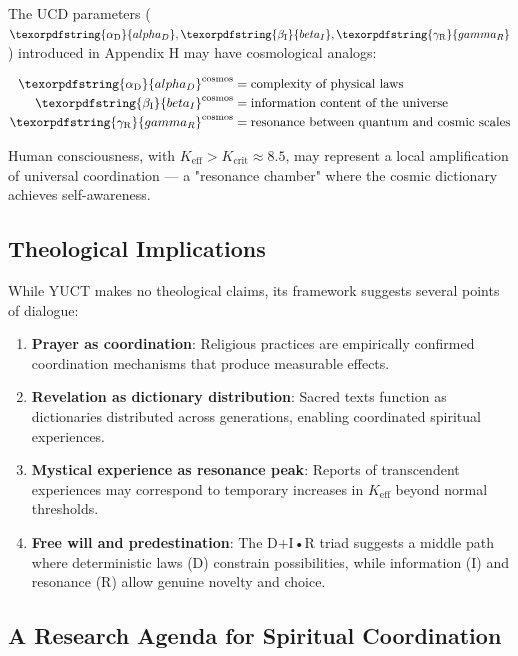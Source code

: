 \documentclass[12pt,a4paper]{article}
\DeclareRobustCommand{\alD}{\texorpdfstring{\ensuremath{\alpha_{\mathrm{D}}}}{alpha_D}}
\DeclareRobustCommand{\beI}{\texorpdfstring{\ensuremath{\beta_{\mathrm{I}}}}{beta_I}}
\DeclareRobustCommand{\gaR}{\texorpdfstring{\ensuremath{\gamma_{\mathrm{R}}}}{gamma_R}}
\newcommand{\Kcrit}{K_{\mathrm{crit}}}
\begin{document}
	The UCD parameters ($\alD, \beI, \gaR$) introduced in Appendix H may have cosmological analogs:
	
	\begin{align*}
		\alD^{\mathrm{cosmos}} &= \text{complexity of physical laws} \\
		\beI^{\mathrm{cosmos}} &= \text{information content of the universe} \\
		\gaR^{\mathrm{cosmos}} &= \text{resonance between quantum and cosmic scales}
	\end{align*}
	
	Human consciousness, with $K_{\mathrm{eff}} > \Kcrit \approx 8.5$, may represent a local amplification of universal coordination — a "resonance chamber" where the cosmic dictionary achieves self-awareness.
	
	\subsection{Theological Implications}
	
	While YUCT makes no theological claims, its framework suggests several points of dialogue:
	
	\begin{enumerate}
		\item \textbf{Prayer as coordination}: Religious practices are empirically confirmed coordination mechanisms that produce measurable effects.
		
		\item \textbf{Revelation as dictionary distribution}: Sacred texts function as dictionaries distributed across generations, enabling coordinated spiritual experiences.
		
		\item \textbf{Mystical experience as resonance peak}: Reports of transcendent experiences may correspond to temporary increases in $K_{\mathrm{eff}}$ beyond normal thresholds.
		
		\item \textbf{Free will and predestination}: The D+I•R triad suggests a middle path where deterministic laws (D) constrain possibilities, while information (I) and resonance (R) allow genuine novelty and choice.
	\end{enumerate}
	
	\subsection{A Research Agenda for Spiritual Coordination}
	
\end{document}
